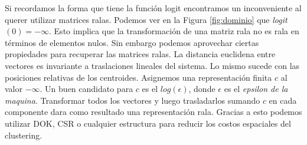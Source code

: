 
Si recordamos la forma que tiene la funci\'on logit encontramos un inconveniente
al querer utilizar matrices ralas. Podemos ver en la Figura \ref{fig:dominio} que
\textit{logit}$(0) = -\infty$. Esto implica que la transformaci\'on de una matriz
rala no es rala en t\'erminos de elementos nulos. Sin embargo podemos aprovechar
ciertas propiedades para recuperar las matrices ralas. La distancia euclidena 
entre vectores es invariante a traslaciones lineales del sistema. Lo mismo sucede
con las posiciones relativas de los centroides. Asignemos una representaci\'on 
finita $c$ al valor $-\infty$. Un buen candidato para $c$ es el $log(\epsilon)$,
donde $\epsilon$ es el \textit{epsilon de la maquina}. Transformar todos los vectores
y luego trasladarlos sumando $c$ en cada componente dara como resultado una
representaci\'on rala. Gracias a esto podemos utilizar DOK, CSR o cualquier
estructura para reducir los costos espaciales del clustering. \\






